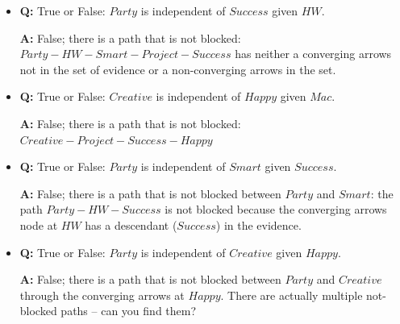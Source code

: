 \documentclass[11pt,letterpaper]{article}
\begin{document}
\begin{itemize}
\item \textbf{Q:} True or False: $Party$ is independent of $Success$ given $HW$. 

\begin{solution}
\textbf{A:}  False; there is a path that is not blocked:  
 $Party - HW - Smart - Project - Success$ has neither a converging arrows
not in the set of evidence or a non-converging arrows in
the set.\\
\end{solution}


\item \textbf{Q:} True or False: $Creative$ is independent of $Happy$ given $Mac$. 

\begin{solution}
\textbf{A:}  False; there is a path that is not blocked: 
 $Creative -  Project - Success - Happy$\\
\end{solution}


\item \textbf{Q:} True or False: $Party$ is independent of $Smart$  given $Success$. 

\begin{solution}
\textbf{A:} False; there is a path that is not blocked between $Party$ and $Smart$:
the path $Party - HW - Success$ is not blocked because the converging arrows
node at $HW$ has a descendant ($Success$) in the evidence.\\
\end{solution}


\item \textbf{Q:} True or False: $Party$ is independent of $Creative$  given $Happy$. 

\begin{solution}
\textbf{A:} False; there is a path that is not blocked between $Party$ and $Creative$ through the converging arrows at $Happy$. There are actually multiple not-blocked paths -- can you find them?\\
\end{solution}


\end{itemize}
\end{document}
